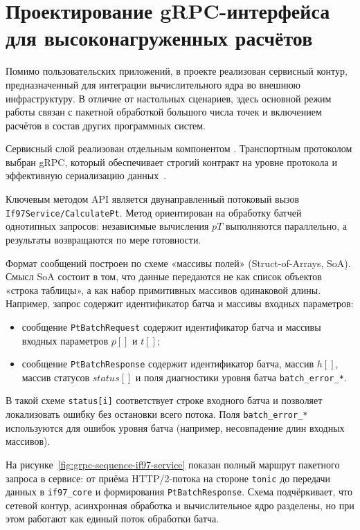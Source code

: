 \section[gRPC-интерфейс для высоконагруженных расчётов]{Проектирование gRPC-интерфейса для высоконагруженных расчётов}

Помимо пользовательских приложений, в проекте реализован сервисный контур, предназначенный для интеграции вычислительного ядра во внешнюю инфраструктуру.  
В отличие от настольных сценариев, здесь основной режим работы связан с пакетной обработкой большого числа точек и включением расчётов в состав других программных систем.  

Сервисный слой реализован отдельным компонентом .  
Транспортным протоколом выбран gRPC, который обеспечивает строгий контракт на уровне протокола и эффективную сериализацию данных~\cite{grpc_docs}.  

Ключевым методом API является двунаправленный потоковый вызов \texttt{If97Service/CalculatePt}.  
Метод ориентирован на обработку батчей однотипных запросов:
независимые вычисления $pT$ выполняются параллельно,
а результаты возвращаются по мере готовности.  

Формат сообщений построен по схеме «массивы полей» (Struct-of-Arrays, SoA).  
Смысл SoA состоит в том, что данные передаются не как список объектов «строка таблицы», а как набор примитивных массивов одинаковой длины.  
Например, запрос содержит идентификатор батча и массивы входных параметров:
\begin{itemize}
\item сообщение \texttt{PtBatchRequest} содержит идентификатор батча и массивы входных параметров $p[]$ и $t[]$;  
\item сообщение \texttt{PtBatchResponse} содержит идентификатор батча, массив $h[]$, массив статусов $status[]$ и поля диагностики уровня батча \texttt{batch\_error\_*}.  
\end{itemize}

В такой схеме \texttt{status[i]} соответствует строке входного батча
и позволяет локализовать ошибку без остановки всего потока.
Поля \texttt{batch\_error\_*} используются для ошибок уровня батча
(например, несовпадение длин входных массивов).

На рисунке~\ref{fig:grpc-sequence-if97-service} показан полный маршрут
пакетного запроса в сервисе:
от приёма HTTP/2-потока на стороне \texttt{tonic}
до передачи данных в \texttt{if97\_core}
и формирования \texttt{PtBatchResponse}.
Схема подчёркивает, что сетевой контур,
асинхронная обработка и вычислительное ядро разделены,
но при этом работают как единый поток обработки батча.

